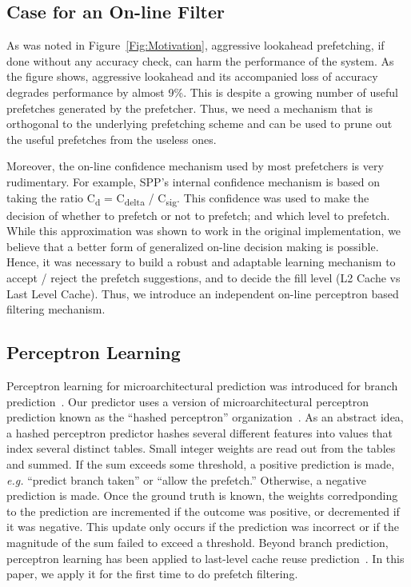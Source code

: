 \subsection{Case for an On-line Filter}
\label{Background-Case}

As was noted in Figure~\ref{Fig:Motivation}, aggressive lookahead
prefetching, if done without any accuracy check, can harm the
performance of the system. As the figure shows, aggressive lookahead
and its accompanied loss of accuracy degrades performance by almost
9\%.  This is despite a growing number of useful prefetches generated
by the prefetcher.  Thus, we need a mechanism that is orthogonal to
the underlying prefetching scheme and can be used to prune out the
useful prefetches from the useless ones.

Moreover, the on-line confidence mechanism used by most prefetchers is
very rudimentary. For example, SPP's internal confidence mechanism is
based on taking the ratio C\textsubscript{d} = C\textsubscript{delta}
/ C\textsubscript{sig}. This confidence was used to make the decision
of whether to prefetch or not to prefetch; and which level to
prefetch.  While this approximation was shown to work in the original
implementation, we believe that a better form of generalized on-line
decision making is possible. Hence, it was necessary to build a
robust and adaptable learning mechanism to accept / reject the
prefetch suggestions, and to decide the fill level (L2 Cache vs Last
Level Cache). Thus, we introduce an independent on-line perceptron
based filtering mechanism.

\subsection{Perceptron Learning}
\label{sec:Background-Perceptron}
Perceptron learning for microarchitectural prediction was introduced
for branch prediction~\cite{PerceptronPredictor}. Our predictor uses a
version of microarchitectural perceptron prediction known as the
``hashed perceptron'' organization~\cite{HashedPerceptron}. As an
abstract idea, a hashed perceptron predictor hashes several different
features into values that index several distinct tables. Small integer
weights are read out from the tables and summed. If the sum exceeds
some threshold, a positive prediction is made, {\em e.g.} ``predict
branch taken'' or ``allow the prefetch.'' Otherwise, a negative
prediction is made. Once the ground truth is known, the weights
corredponding to the prediction are incremented if the outcome was
positive, or decremented if it was negative. This update only occurs
if the prediction was incorrect or if the magnitude of the sum failed
to exceed a threshold.  Beyond branch prediction, perceptron learning
has been applied to last-level cache reuse
prediction~\cite{Perc_Reuse,Multiperspective}. In this paper, we apply
it for the first time to do prefetch filtering.
